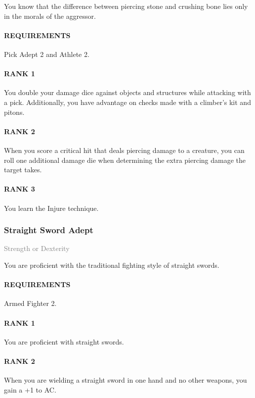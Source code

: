 \normalsize
You know that the difference between piercing stone and crushing bone lies only in the morals of the aggressor.
\paragraph{REQUIREMENTS} Pick Adept 2 and Athlete 2.
\paragraph{RANK 1} You double your damage dice against objects and structures while attacking with a pick.
Additionally, you have advantage on checks made with a climber's kit and pitons.
\paragraph{RANK 2} When you score a critical hit that deals piercing damage to a creature, you can roll one additional damage die when determining the extra piercing damage the target takes.
\paragraph{RANK 3} You learn the Injure technique.

\subsubsection{Straight Sword Adept} \label{feat::straightswordadept}
\small{\textcolor{gray}{Strength or Dexterity}}

\normalsize
You are proficient with the traditional fighting style of straight swords.
\paragraph{REQUIREMENTS} Armed Fighter 2.
\paragraph{RANK 1} You are proficient with straight swords.
\paragraph{RANK 2} When you are wielding a straight sword in one hand and no other weapons, you gain a +1 to AC.
